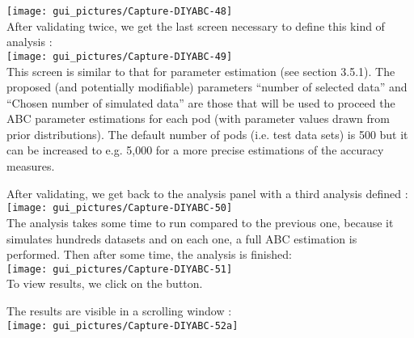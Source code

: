 \texttt{[image: gui\_pictures/Capture-DIYABC-48]} \\


After validating twice, we get the last screen necessary to define
this kind of analysis :\\


\texttt{[image: gui\_pictures/Capture-DIYABC-49]} \\


This screen is similar to that for parameter estimation (see section
3.5.1). The proposed (and potentially modifiable) parameters ``number
of selected data'' and ``Chosen number of simulated data'' are
those that will be used to proceed the ABC parameter estimations for
each pod (with parameter values drawn from prior distributions). The
default number of pods (i.e. test data sets) is 500 but it can be
increased to e.g. 5,000 for a more precise estimations of the accuracy
measures.

After validating, we get back to the analysis panel with a third analysis
defined :\\


\texttt{[image: gui\_pictures/Capture-DIYABC-50]} \\


The analysis takes some time to run compared to the previous one,
because it simulates hundreds datasets and on each one, a full ABC
estimation is performed. Then after some time, the analysis is finished:
\\


\texttt{[image: gui\_pictures/Capture-DIYABC-51]} \\


To view results, we click on the  button.

\newpage{}

The results are visible in a scrolling window :\\


\texttt{[image: gui\_pictures/Capture-DIYABC-52a]} \\


